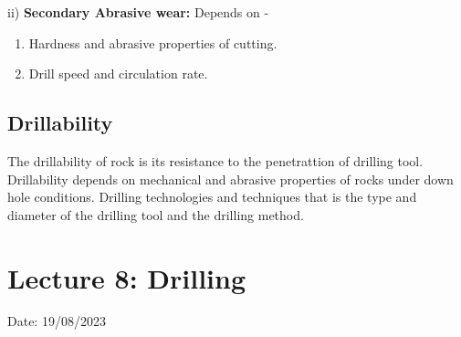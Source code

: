 \documentclass{article}
\begin{document}
\begin{multicols}{2}
  ii) \textbf{Secondary Abrasive wear:} Depends on -
  \begin{enumerate}
    \item Hardness and abrasive properties of cutting.
    \item Drill speed and circulation rate. 
  \end{enumerate}

  \subsection*{Drillability}
  The drillability of rock is its resistance to the penetrattion of drilling tool. Drillability depends on mechanical and abrasive properties of rocks under down hole conditions. Drilling technologies and techniques that is the type and  diameter of the drilling tool and the drilling method. 
\end{multicols}
  

\section{Lecture 8: Drilling}
\hfill Date: 19/08/2023
\end{document}
